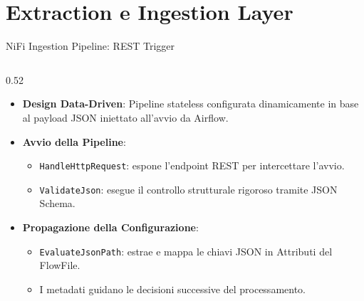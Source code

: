 \documentclass[10pt, aspectratio=169]{beamer}
\begin{document}

\section{Extraction e Ingestion Layer}\label{sec:extraction_and_ingestion_layer}

\begin{frame}[fragile]{NiFi Ingestion Pipeline: REST Trigger}
    \begin{columns}[c]
        \begin{column}{0.52\textwidth}
            \begin{itemize}
                \item \textbf{Design Data-Driven}: Pipeline stateless configurata dinamicamente in base al payload JSON iniettato all'avvio da Airflow.

                \item \textbf{Avvio della Pipeline}:
                \begin{itemize}
                    \item \texttt{HandleHttpRequest}: espone l'endpoint REST per intercettare l'avvio.
                    \item \texttt{ValidateJson}: esegue il controllo strutturale rigoroso tramite JSON Schema.
                \end{itemize}

                \item \textbf{Propagazione della Configurazione}:
                \begin{itemize}
                    \item \texttt{EvaluateJsonPath}: estrae e mappa le chiavi JSON in Attributi del FlowFile.
                    \item I metadati guidano le decisioni successive del processamento.
                \end{itemize}
            \end{itemize}
        \end{column}


\end{columns}
\end{frame}
\end{document}
